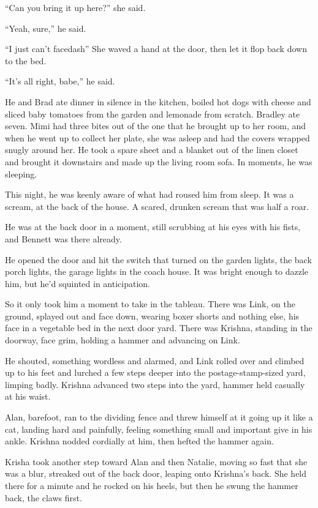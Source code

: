 ``Can you bring it up here?'' she said.

``Yeah, sure,'' he said. 

``I just can't facedash{}'' She waved a hand at the door, then let it
flop back down to the bed.

``It's all right, babe,'' he said.

He and Brad ate dinner in silence in the kitchen, boiled hot dogs with
cheese and sliced baby tomatoes from the garden and lemonade from
scratch.  Bradley ate seven.  Mimi had three bites out of the one that
he brought up to her room, and when he went up to collect her plate,
she was asleep and had the covers wrapped snugly around her.  He took
a spare sheet and a blanket out of the linen closet and brought it
downstairs and made up the living room sofa.  In moments, he was
sleeping.

This night, he was keenly aware of what had roused him from sleep.  It
was a scream, at the back of the house.  A scared, drunken scream that
was half a roar.

He was at the back door in a moment, still scrubbing at his eyes with
his fists, and Bennett was there already. 

He opened the door and hit the switch that turned on the garden
lights, the back porch lights, the garage lights in the coach house. 
It was bright enough to dazzle him, but he'd squinted in anticipation.

So it only took him a moment to take in the tableau.  There was Link,
on the ground, splayed out and face down, wearing boxer shorts and
nothing else, his face in a vegetable bed in the next door yard. 
There was Krishna, standing in the doorway, face grim, holding a
hammer and advancing on Link.

He shouted, something wordless and alarmed, and Link rolled over and
climbed up to his feet and lurched a few steps deeper into the
postage-stamp-sized yard, limping badly.  Krishna advanced two steps
into the yard, hammer held casually at his waist.

Alan, barefoot, ran to the dividing fence and threw himself at it
going up it like a cat, landing hard and painfully, feeling something
small and important give in his ankle.  Krishna nodded cordially at
him, then hefted the hammer again.

Krisha took another step toward Alan and then Natalie, moving so fast
that she was a blur, streaked out of the back door, leaping onto
Krishna's back.  She held there for a minute and he rocked on his
heels, but then he swung the hammer back, the claws first. 

